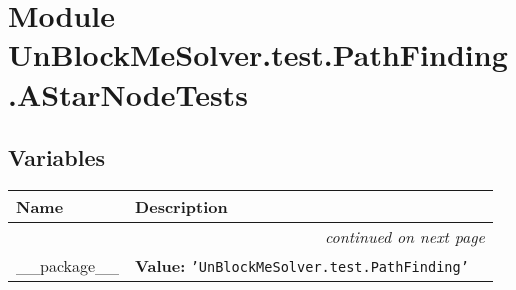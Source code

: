 %
%
%


\section{Module UnBlockMeSolver.test.PathFinding.AStarNodeTests}

    \label{UnBlockMeSolver:test:PathFinding:AStarNodeTests}


  \subsection{Variables}

    \vspace{-1cm}
\hspace{\varindent}\begin{longtable}{|p{\varnamewidth}|p{\vardescrwidth}|l}
\cline{1-2}
\cline{1-2} \centering \textbf{Name} & \centering \textbf{Description}& \\
\cline{1-2}
\endhead\cline{1-2}\multicolumn{3}{r}{\small\textit{continued on next page}}\\\endfoot\cline{1-2}
\endlastfoot\raggedright \_\-\_\-p\-a\-c\-k\-a\-g\-e\-\_\-\_\- & \raggedright \textbf{Value:} 
{\tt \texttt{'}\texttt{UnBlockMeSolver.test.PathFinding}\texttt{'}}&\\
\cline{1-2}
\end{longtable}



